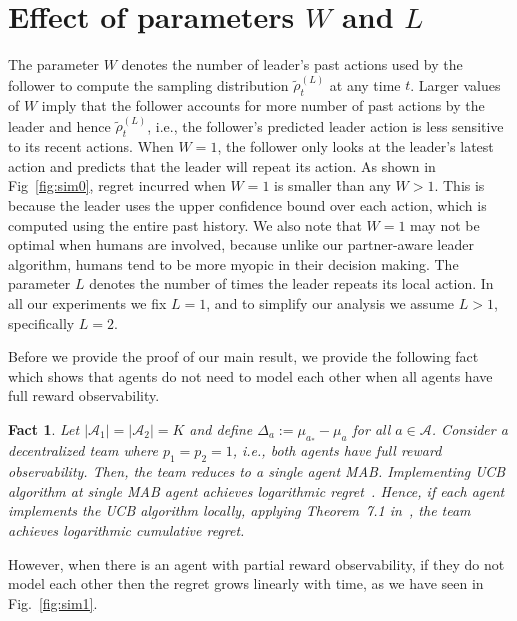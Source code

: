 \documentclass[letterpaper]{article} %
\newtheorem{fact}{Fact}
\theoremstyle{definition}
\def\reg{\mathsf{R}}
\def\mc{\mathcal}
\begin{document}
\section{Effect of parameters $W$ and $L$}
\label{appendix:effect_of_w_and_l}
The parameter $W$ denotes the number of leader's past actions used by the follower to compute the sampling distribution $\tilde{\rho}^{(L)}_t$ at any time $t$. Larger values of $W$ imply that the follower accounts for more number of past actions by the leader and hence $\tilde{\rho}^{(L)}_t$, i.e., the follower's predicted leader action is less sensitive to its recent actions. When $W=1$, the follower only looks at the leader's latest action and predicts that the leader will repeat its action. As shown in Fig~\ref{fig:sim0}, regret incurred when $W=1$ is smaller than any $W> 1$. This is because the leader uses the upper confidence bound over each action, which is computed using the entire past history. We also note that $W=1$ may not be optimal when humans are involved, because unlike our partner-aware leader algorithm, humans tend to be more myopic in their decision making. The parameter $L$ denotes the number of times the leader repeats its local action. In all our experiments we fix $L=1$, and to simplify our analysis we assume $L>1$, specifically $L=2$. 

Before we provide the proof of our main result, we provide the following fact which shows that agents do not need to model each other when all agents have full reward observability.

\begin{fact}
Let $|\mc{A}_1| \!=\! |\mc{A}_2| \!=\! K$ and define $\Delta_a\!:=\! \mu_{a_{\ast}}\!-\!\mu_a$ for all $a \!\in\! \mc{A}$. Consider a decentralized team where $p_1 = p_2 = 1$, i.e., both agents have full reward observability. Then, the team reduces to a single agent MAB. Implementing UCB algorithm at single MAB agent achieves logarithmic regret~\cite{lattimore_szepesvari_2020}. Hence, if each agent implements the UCB algorithm locally, applying Theorem~7.1 in~\cite{lattimore_szepesvari_2020}, the team achieves logarithmic cumulative regret.
\end{fact}

However, when there is an agent with partial reward observability, if they do not model each other then the regret grows linearly with time, as we have seen in Fig.~\ref{fig:sim1}. 
\end{document}
